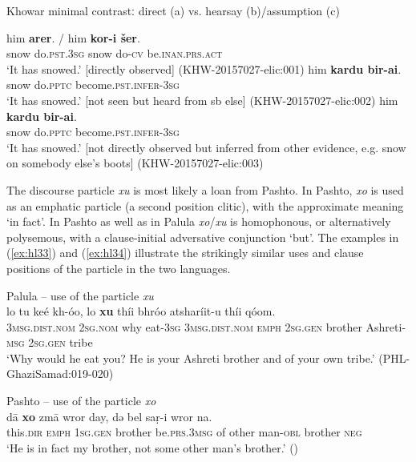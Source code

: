 \documentclass[output=paper]{langsci/langscibook}
\begin{document}
\begin{exe}
\ex Khowar minimal contrastː direct (a) vs. hearsay (b)/assumption (c) \label{ex:hl32}\\
	\begin{xlist}
	\ex 
	\gll him \textbf{arer}. /  him \textbf{kor-i šer}.\\
	snow do.\textsc{pst}.3\textsc{sg} {} snow do-\textsc{cv} be.\textsc{inan}.\textsc{prs}.\textsc{act}\\
	\trans ‘It has snowed.’ [directly observed] (KHW-20157027-elic:001)
	\ex 
	\gll him \textbf{kardu bir-ai}.\\
	snow do.\textsc{pptc} become.\textsc{pst}.\textsc{infer}-3\textsc{sg}\\
	\trans ‘It has snowed.’ [not seen but heard from sb else] (KHW-20157027-elic:002)
	\ex him \textbf{kardu bir-ai}.\\
	snow do.\textsc{pptc} become.\textsc{pst}.\textsc{infer}-3\textsc{sg}\\
	\trans ‘It has snowed.’ [not directly observed but inferred from other evidence, e.g. snow on somebody else’s boots] (KHW-20157027-elic:003)
	\end{xlist}
\end{exe}

The discourse particle \textit{xu} is most likely a loan from Pashto. In Pashto, \textit{xo} is used as an emphatic particle (a second position clitic), with the approximate meaning ‘in fact’. In Pashto as well as in Palula \textit{xo}/\textit{xu} is homophonous, or alternatively polysemous, with a clause-initial adversative conjunction ‘but’. The examples in ‎(\ref{ex:hl33}) and ‎(\ref{ex:hl34}) illustrate the strikingly similar uses and clause positions of the particle in the two languages.

\begin{exe}
\ex Palula -- use of the particle \textit{xu} \label{ex:hl33}\\
	\gll lo tu keé kh-óo, lo \textbf{xu} thíi bhróo atsharíit-u thíi qóom.\\
	3\textsc{msg}.\textsc{dist}.\textsc{nom} 2\textsc{sg}.\textsc{nom} why eat-3\textsc{sg} 3\textsc{msg}.\textsc{dist}.\textsc{nom} \textsc{emph} 2\textsc{sg}.\textsc{gen} brother Ashreti-\textsc{msg} 2\textsc{sg}.\textsc{gen} tribe\\
	\trans ‘Why would he eat you? He is your Ashreti brother and of your own tribe.’ (PHL-GhaziSamad:019-020)
\end{exe}

\begin{exe}
\ex Pashto -- use of the particle \textit{xo} \label{ex:hl34}\\
	\gll dā \textbf{xo} zmā wror day, də bel saṛ-i wror na.\\
	this.\textsc{dir} \textsc{emph} 1\textsc{sg}.\textsc{gen} brother be.\textsc{prs}.3\textsc{msg} of other man-\textsc{obl} brother \textsc{neg}\\
	\trans ‘He is in fact my brother, not some other man’s brother.’ (\citealt[375]{David2013})
\end{exe}
\end{document}
